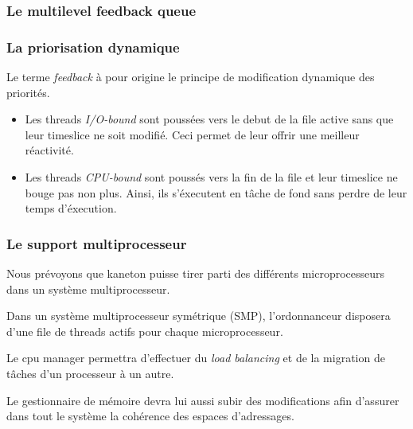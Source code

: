
\begin{frame}
  \frametitle{Le multilevel feedback queue}

  \begin{center}
  \end{center}
\end{frame}


\begin{frame}
  \frametitle{La priorisation dynamique}

  Le terme \emph{feedback} \`{a} pour origine le principe de
  modification dynamique des priorit\'{e}s.

  \begin{itemize}
  \item
    Les threads \emph{I/O-bound} sont pouss\'{e}es vers le debut de la
    file active sans que leur timeslice ne soit modifi\'{e}. Ceci permet
    de leur offrir une meilleur r\'{e}activit\'{e}.

  \item
    Les threads \emph{CPU-bound} sont pouss\'{e}s vers la fin de la file
    et leur timeslice ne bouge pas non plus. Ainsi, ils s'\'{e}xecutent en
    tâche de fond sans perdre de leur temps d'\'{e}xecution.

  \end{itemize}

\end{frame}


\begin{frame}
  \frametitle{Le support multiprocesseur}

  Nous pr\'{e}voyons que kaneton puisse tirer parti des diff\'{e}rents
  microprocesseurs dans un syst\`{e}me multiprocesseur.

  \-

  Dans un syst\`{e}me multiprocesseur sym\'{e}trique (SMP),
  l'ordonnanceur disposera d'une file de threads actifs pour chaque
  microprocesseur.

  Le cpu manager permettra d'effectuer du \emph{load balancing} et de
  la migration de t\^{a}ches d'un processeur \`{a} un autre.

  \-

  Le gestionnaire de m\'{e}moire devra lui aussi subir des
  modifications afin d'assurer dans tout le syst\`{e}me la
  coh\'{e}rence des espaces d'adressages.

\end{frame}


